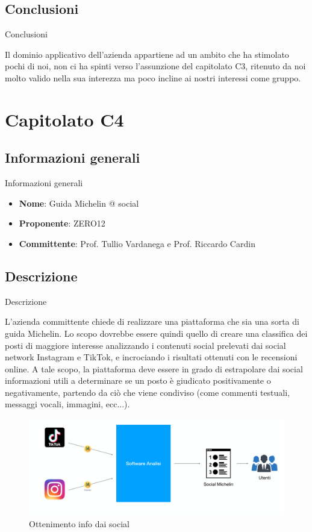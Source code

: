 \documentclass[11pt]{article}
\begin{document}
    \subsection{Conclusioni} Conclusioni
    
    Il dominio applicativo dell'azienda appartiene ad un ambito che ha stimolato pochi di noi, non ci ha spinti verso l'assunzione del capitolato C3, ritenuto da noi molto valido nella sua interezza ma poco incline ai nostri interessi come gruppo.    
    
\newpage
    
\section{Capitolato C4}
    \subsection{Informazioni generali} Informazioni generali
    \begin{itemize}
        \item \textbf{Nome}: Guida Michelin @ social
        \item \textbf{Proponente}: ZERO12
        \item \textbf{Committente}: Prof. Tullio Vardanega e Prof. Riccardo Cardin
    \end{itemize}
    \subsection{Descrizione} Descrizione
    
    L’azienda committente chiede di realizzare una piattaforma che sia una sorta di guida Michelin. Lo scopo dovrebbe essere quindi quello di creare una classifica dei posti di maggiore interesse analizzando i contenuti social prelevati dai social network Instagram e TikTok, e incrociando i risultati ottenuti con le recensioni online. A tale scopo, la piattaforma deve essere in grado di estrapolare dai social informazioni utili a determinare se un posto è giudicato positivamente o negativamente, partendo da ciò che viene condiviso (come commenti testuali, messaggi vocali, immagini, ecc...).
    
    \begin{figure}[h!]
        \centering
        \includegraphics[scale=0.4]{Res/C4.PNG}
        \caption{Ottenimento info dai social}
        \label{GuidaMIchelin}
    \end{figure}
    
\end{document}
